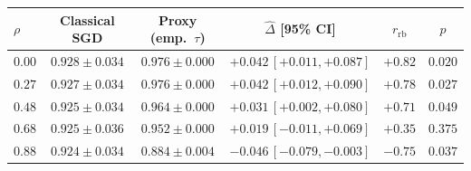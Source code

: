 \documentclass[sensors,article,submit,pdftex,moreauthors]{Definitions/mdpi}
\providecommand{\DIFaddbeginFL}{} %
\providecommand{\DIFaddendFL}{} %
\providecommand{\DIFdelbeginFL}{} %
\providecommand{\DIFdelendFL}{} %
\begin{document}
\begin{table}[t]
\label{tab:markov_summary}
\DIFdelbeginFL %
\DIFdelendFL \DIFaddbeginFL \begin{tabular}{lccccc}
\hline
$\rho$ & Classical SGD & Proxy (emp.\ $\tau$) & $\hat{\Delta}$ [95\% CI] & $r_{\mathrm{rb}}$ & $p$ \\
\hline
$0.00$ & $0.928 \pm 0.034$ & $0.976 \pm 0.000$ & $+0.042\,[+0.011, +0.087]$ & $+0.82$ & $0.020$ \\
$0.27$ & $0.927 \pm 0.034$ & $0.976 \pm 0.000$ & $+0.042\,[+0.012, +0.090]$ & $+0.78$ & $0.027$ \\
$0.48$ & $0.925 \pm 0.034$ & $0.964 \pm 0.000$ & $+0.031\,[+0.002, +0.080]$ & $+0.71$ & $0.049$ \\
$0.68$ & $0.925 \pm 0.036$ & $0.952 \pm 0.000$ & $+0.019\,[-0.011, +0.069]$ & $+0.35$ & $0.375$ \\
$0.88$ & $0.924 \pm 0.034$ & $0.884 \pm 0.004$ & $-0.046\,[-0.079, -0.003]$ & $-0.75$ & $0.037$ \\
\hline
\end{tabular}
\DIFaddendFL \end{table}
\end{document}

